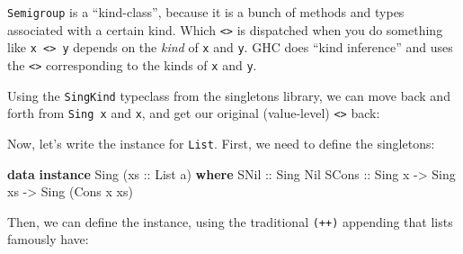 \documentclass[]{article}
\newenvironment{Shaded}{}{}
\newcommand{\DataTypeTok}[1]{\textcolor[rgb]{0.56,0.13,0.00}{#1}}
\newcommand{\KeywordTok}[1]{\textcolor[rgb]{0.00,0.44,0.13}{\textbf{#1}}}
\newcommand{\NormalTok}[1]{#1}
\newcommand{\OperatorTok}[1]{\textcolor[rgb]{0.40,0.40,0.40}{#1}}
\newcommand{\OtherTok}[1]{\textcolor[rgb]{0.00,0.44,0.13}{#1}}
\begin{document}
\texttt{Semigroup} is a ``kind-class'', because it is a bunch of methods and
types associated with a certain kind. Which \texttt{\textless{}\textgreater{}}
is dispatched when you do something like
\texttt{x\ \textless{}\textgreater{}\ y} depends on the \emph{kind} of
\texttt{x} and \texttt{y}. GHC does ``kind inference'' and uses the
\texttt{\textless{}\textgreater{}} corresponding to the kinds of \texttt{x} and
\texttt{y}.

Using the \texttt{SingKind} typeclass from the singletons library, we can move
back and forth from \texttt{Sing\ x} and \texttt{x}, and get our original
(value-level) \texttt{\textless{}\textgreater{}} back:

\begin{Shaded}
\end{Shaded}

Now, let's write the instance for \texttt{List}. First, we need to define the
singletons:

\begin{Shaded}
\begin{Highlighting}[]
\KeywordTok{data} \KeywordTok{instance} \DataTypeTok{Sing}\NormalTok{ (}\OtherTok{xs ::} \DataTypeTok{List}\NormalTok{ a) }\KeywordTok{where}
    \DataTypeTok{SNil}\OtherTok{  ::} \DataTypeTok{Sing} \DataTypeTok{Nil}
    \DataTypeTok{SCons}\OtherTok{ ::} \DataTypeTok{Sing}\NormalTok{ x }\OtherTok{{-}>} \DataTypeTok{Sing}\NormalTok{ xs }\OtherTok{{-}>} \DataTypeTok{Sing}\NormalTok{ (}\DataTypeTok{Cons}\NormalTok{ x xs)}
\end{Highlighting}
\end{Shaded}

Then, we can define the instance, using the traditional \texttt{(++)} appending
that lists famously have:
\end{document}

